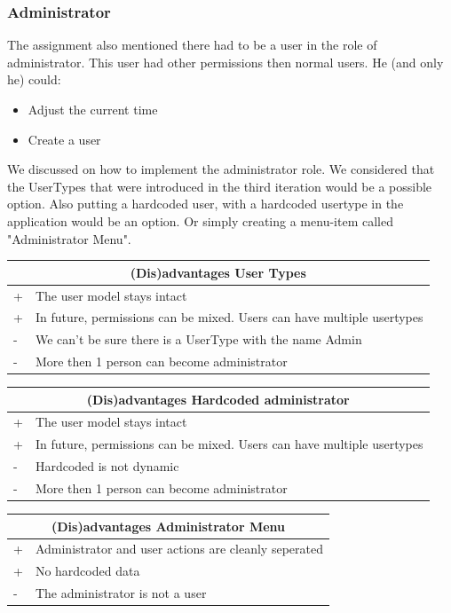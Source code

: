 			\subsubsection{Administrator}
			The assignment also mentioned there had to be a user in the role of administrator. This user had other permissions then normal users. He (and only he) could:
			\begin{itemize}
				\item{Adjust the current time}
				\item{Create a user}
			\end{itemize}
			
			We discussed on how to implement the administrator role. We considered that the UserTypes that were introduced in the third iteration would be a possible option. Also putting a hardcoded user, with a hardcoded usertype in the application would be an option. Or simply creating a menu-item called "Administrator Menu".\\
			\begin{tabular}{|l|l|}
				\hline
				\multicolumn{2}{|c|}{(Dis)advantages User Types} \\
				\hline
				+ & The user model stays intact\\
				+ & In future, permissions can be mixed. Users can have multiple usertypes\\
				\hline
				- & We can't be sure there is a UserType with the name Admin\\
				- & More then 1 person can become administrator\\
				\hline
			\end{tabular}
			
			\begin{tabular}{|l|l|}
				\hline
				\multicolumn{2}{|c|}{(Dis)advantages Hardcoded administrator} \\
				\hline
				+ & The user model stays intact\\
				+ & In future, permissions can be mixed. Users can have multiple usertypes\\
				\hline
				- & Hardcoded is not dynamic\\
				- & More then 1 person can become administrator\\
				\hline
			\end{tabular}
			
			\begin{tabular}{|l|l|}
				\hline
				\multicolumn{2}{|c|}{(Dis)advantages Administrator Menu} \\
				\hline
				+ & Administrator and user actions are cleanly seperated\\
				+ & No hardcoded data\\
				\hline
				- & The administrator is not a user\\
				\hline
			\end{tabular}
			
